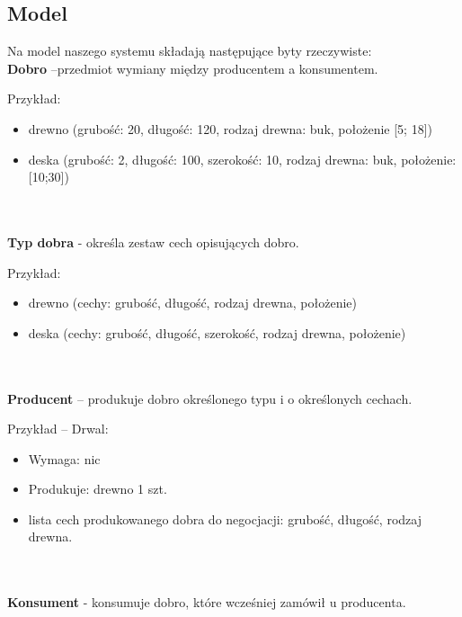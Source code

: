 \documentclass[a4paper,12pt]{article}
\begin{document}
\newpage

\subsection{Model}

Na model naszego systemu składają  następujące byty rzeczywiste:
\\
\textbf{Dobro} --przedmiot wymiany między producentem a konsumentem.

Przykład:
\begin{itemize}
\item drewno (grubość: 20, długość: 120, rodzaj drewna: buk, położenie [5; 18])
\item deska (grubość: 2, długość: 100, szerokość: 10, rodzaj drewna: buk, położenie: [10;30])
\end{itemize}
\\ \\
\textbf{Typ dobra} - określa zestaw cech opisujących dobro.

Przykład:
\begin{itemize}
\item drewno (cechy: grubość, długość, rodzaj drewna, położenie)
\item deska (cechy: grubość, długość, szerokość, rodzaj drewna, położenie)
\end{itemize}
\\ \\
\textbf{Producent} -- produkuje dobro określonego typu i o określonych cechach.

Przykład – Drwal:
\begin{itemize}
\item Wymaga: nic
\item Produkuje: drewno 1 szt.
\item lista cech produkowanego dobra do negocjacji: grubość, długość, rodzaj drewna.
\end{itemize}
\\ \\
\textbf{Konsument} - konsumuje dobro, które wcześniej zamówił u producenta.
\end{document}
